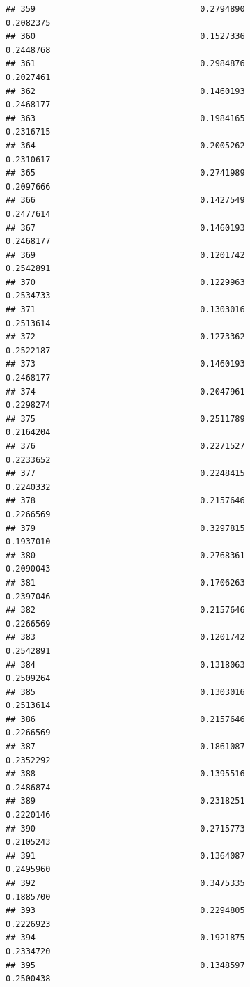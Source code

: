\documentclass[
  american,
  man,floatsintext]{apa7}
\begin{document}
\begin{verbatim}
## 359                                 0.2794890               0.2082375
## 360                                 0.1527336               0.2448768
## 361                                 0.2984876               0.2027461
## 362                                 0.1460193               0.2468177
## 363                                 0.1984165               0.2316715
## 364                                 0.2005262               0.2310617
## 365                                 0.2741989               0.2097666
## 366                                 0.1427549               0.2477614
## 367                                 0.1460193               0.2468177
## 369                                 0.1201742               0.2542891
## 370                                 0.1229963               0.2534733
## 371                                 0.1303016               0.2513614
## 372                                 0.1273362               0.2522187
## 373                                 0.1460193               0.2468177
## 374                                 0.2047961               0.2298274
## 375                                 0.2511789               0.2164204
## 376                                 0.2271527               0.2233652
## 377                                 0.2248415               0.2240332
## 378                                 0.2157646               0.2266569
## 379                                 0.3297815               0.1937010
## 380                                 0.2768361               0.2090043
## 381                                 0.1706263               0.2397046
## 382                                 0.2157646               0.2266569
## 383                                 0.1201742               0.2542891
## 384                                 0.1318063               0.2509264
## 385                                 0.1303016               0.2513614
## 386                                 0.2157646               0.2266569
## 387                                 0.1861087               0.2352292
## 388                                 0.1395516               0.2486874
## 389                                 0.2318251               0.2220146
## 390                                 0.2715773               0.2105243
## 391                                 0.1364087               0.2495960
## 392                                 0.3475335               0.1885700
## 393                                 0.2294805               0.2226923
## 394                                 0.1921875               0.2334720
## 395                                 0.1348597               0.2500438

\end{verbatim}
\end{document}

